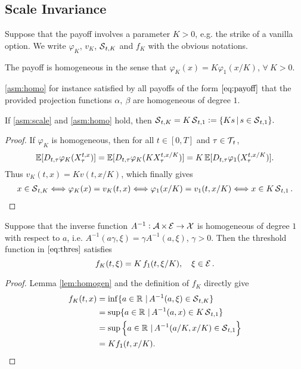 \subsection{Scale Invariance}
Suppose that the payoff involves a parameter $K>0$, e.g. the strike of a vanilla option.  We write $\varphi_K$, $v_K$, $\operatorname{\mathcal{S}}_{t,K}$ and $f_K$ with the obvious notations. 
\begin{asm} \label{asm:homo}
The payoff is homogeneous in the sense that $\varphi_{K}( x)=K \varphi_{1}(x/K)$, $\forall \ K>0$. %
\end{asm}

\cref{asm:homo} for instance satisfied by all payoffs of the form $\eqref{eq:payoff}$  that the provided projection functions $\alpha, \ \beta$ are homogeneous of degree $1$. 
\begin{proposition}\label{lem:homogen}
If  \cref{asm:scale} and \ref{asm:homo} hold,
then 
$\operatorname{\mathcal{S}}_{t,K}=K\operatorname{\mathcal{S}}_{t,1}:= \{Ks \,|\, s \in \operatorname{\mathcal{S}}_{t,1}\}.$
\end{proposition}
\begin{proof}
If $\varphi_K$ is homogeneous, then for all $t\in [0,T]$ and $\tau \in \operatorname{\mathcal{T}}_{\!t}$,
$$ \operatorname{\mathbb{E}}[D_{t,\tau}\varphi_K(X^{t,x}_{\tau})] = \operatorname{\mathbb{E}}[D_{t,\tau}\varphi_K(K X^{t,x/K}_{\tau})] =  K \operatorname{\mathbb{E}}[D_{t,\tau} \varphi_1(X^{t,x/K}_{\tau})].$$
Thus $v_K(t,x) = K v(t,x/K)$, which finally gives 
\begin{align*}
    x \in \operatorname{\mathcal{S}}_{t,K} \Longleftrightarrow \varphi_K(x) = v_K(t,x)
    \Longleftrightarrow \varphi_1(x/K) = v_1(t,x/K)
    \Longleftrightarrow x \in K\operatorname{\mathcal{S}}_{t,1}.
\end{align*}
\end{proof}

\begin{corollary}\label{cor:scale}
Suppose that the inverse function $A^{-1}: \operatorname{\mathcal{A}}\times \operatorname{\mathcal{E}} \to \operatorname{\mathcal{X}}$ is homogeneous of degree $1$ with respect to $a$, i.e. $A^{-1}(a\gamma,\xi) = \gamma A^{-1}(a,\xi)$, $\gamma>0$. Then the threshold function in $\eqref{eq:thres}$ satisfies
$$f_K(t,\xi)= K \, f_1(t,\xi/K), \quad \xi \in \operatorname{\mathcal{E}}.$$
\end{corollary}


\begin{proof}
Lemma \ref{lem:homogen} and the definition of $f_K$ directly give
\begin{align*}
    f_K(t,x) &= \inf \{a \in \operatorname{\mathbb{R}} \,|\, A^{-1}(a,\xi) \in \operatorname{\mathcal{S}}_{t,K} \}\\
&= \sup \{a \in \operatorname{\mathbb{R}} \,|\, A^{-1}(a,x) \in K\operatorname{\mathcal{S}}_{t,1} \}\\
&= \sup \left \{a \in \operatorname{\mathbb{R}} \,|\, A^{-1}(a/K,x/K) \in \operatorname{\mathcal{S}}_{t,1}\right \}\\
&= K f_1(t,x/K).
\end{align*}

\end{proof}

